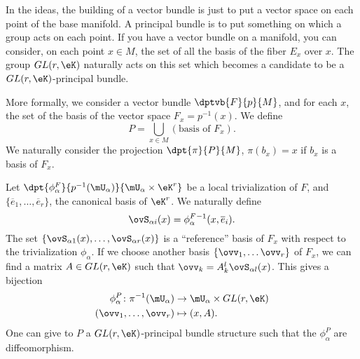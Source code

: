 	In the ideas, the building of a vector bundle is just to put a vector space on each point of the base manifold. A principal bundle is to put something on which a group acts on each point. If you have a vector bundle on a manifold, you can consider, on each point $x\in M$, the set of all the basis of the fiber $E_x$ over $x$. The group $GL(r,\eK)$ naturally acts on this set which becomes a candidate to be a $GL(r,\eK)$-principal bundle.

	More formally, we consider a vector bundle $\dptvb{F}{p}{M}$, and for each $x$, the set of the basis of the vector space $F_x=p^{-1}(x)$. We define
	\[
		P=\bigcup_{x\in M}(\textrm{basis of $F_x$}).
		\]
		We naturally consider the projection $\dpt{\pi}{P}{M}$, $\pi(b_x)=x$ if $b_x$ is a basis of $F_x$.

		Let $\dpt{\phi^F_{\alpha}}{p^{-1}(\mU_{\alpha})}{\mU_{\alpha}\times\eK^r}$ be a local trivialization of $F$, and $\{\overline{e}_1,\ldots,\overline{e}_r\}$, the canonical basis of $\eK^r$. We naturally define
		\[
			\ovS_{\alpha i}(x)=\phi^F_{\alpha}{}^{-1}(x,\overline{e}_i).
			\]
			The set $\{\ovS_{\alpha 1}(x),\ldots,\ovS_{\alpha r}(x)\}$ is a ``reference''{} basis of $F_x$ with respect to the trivialization $\phi_{\alpha}$. If we choose another basis $\{\ovv_1,\ldots\ovv_r\}$ of $F_x$, we can find a matrix $A\in GL(r,\eK)$ such that $\ovv_k=A^l_k\ovS_{\alpha l}(x)$. This gives a bijection
			\begin{equation}
			\begin{aligned}
			\phi_{\alpha}^P\colon \pi^{-1}(\mU_{\alpha}) & \to \mU_{\alpha}\times GL(r,\eK) \\
				(\ovv_1,\ldots,\ovv_r)                       & \mapsto (x,A).
				\end{aligned}
				\end{equation}
				One can give to $P$ a $GL(r,\eK)$-principal bundle structure such that the $\phi_{\alpha}^P$ are diffeomorphism.

